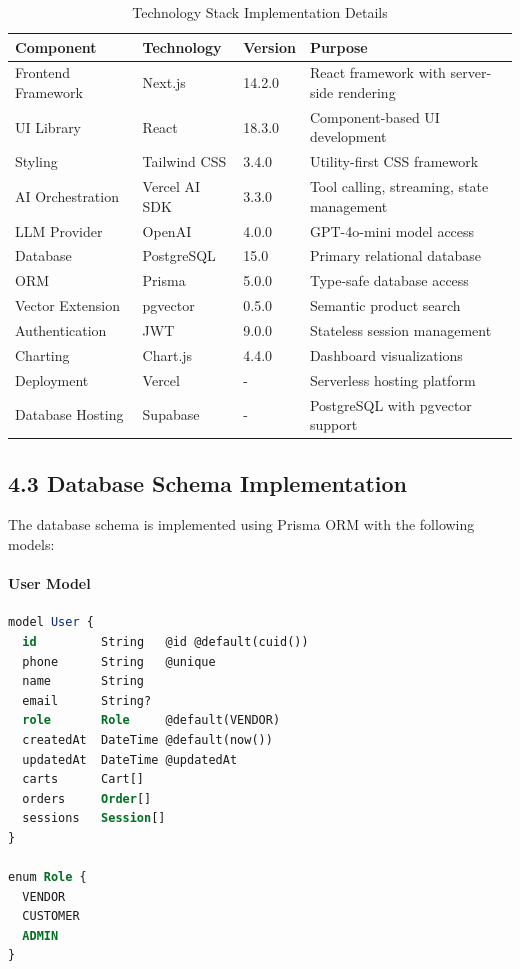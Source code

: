 \documentclass[12pt,a4paper]{article}
\begin{document}
\begin{table}[h]
\centering
\caption{Technology Stack Implementation Details}
\label{tab:tech_stack}
\begin{tabular}{p{4cm}p{4cm}p{3cm}p{4cm}}
\toprule
\textbf{Component} & \textbf{Technology} & \textbf{Version} & \textbf{Purpose} \\
\midrule
Frontend Framework & Next.js & 14.2.0 & React framework with server-side rendering \\
UI Library & React & 18.3.0 & Component-based UI development \\
Styling & Tailwind CSS & 3.4.0 & Utility-first CSS framework \\
AI Orchestration & Vercel AI SDK & 3.3.0 & Tool calling, streaming, state management \\
LLM Provider & OpenAI & 4.0.0 & GPT-4o-mini model access \\
Database & PostgreSQL & 15.0 & Primary relational database \\
ORM & Prisma & 5.0.0 & Type-safe database access \\
Vector Extension & pgvector & 0.5.0 & Semantic product search \\
Authentication & JWT & 9.0.0 & Stateless session management \\
Charting & Chart.js & 4.4.0 & Dashboard visualizations \\
Deployment & Vercel & - & Serverless hosting platform \\
Database Hosting & Supabase & - & PostgreSQL with pgvector support \\
\bottomrule
\end{tabular}
\end{table}

\subsection{4.3 Database Schema Implementation}

The database schema is implemented using Prisma ORM with the following models:

\paragraph{User Model}

\begin{lstlisting}[language=SQL, caption=User Model Schema]
model User {
  id         String   @id @default(cuid())
  phone      String   @unique
  name       String
  email      String?
  role       Role     @default(VENDOR)
  createdAt  DateTime @default(now())
  updatedAt  DateTime @updatedAt
  carts      Cart[]
  orders     Order[]
  sessions   Session[]
}

enum Role {
  VENDOR
  CUSTOMER
  ADMIN
}
\end{lstlisting}
\end{document}
